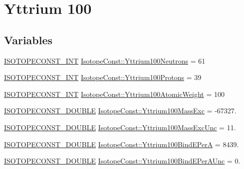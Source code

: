 \hypertarget{group___isotope_const-_yttrium-_y100}{}\section{Yttrium 100}
\label{group___isotope_const-_yttrium-_y100}
\subsection*{Variables}
\begin{DoxyCompactItemize}
\item 
\mbox{\hyperlink{group___isotope_const-_macros_ga5f18360b3e99483a35c32d789e62621c}{I\+S\+O\+T\+O\+P\+E\+C\+O\+N\+S\+T\+\_\+\+I\+NT}} \mbox{\hyperlink{group___isotope_const-_yttrium-_y100_gab26208164dc7413ca570878b73aecf7d}{Isotope\+Const\+::\+Yttrium100\+Neutrons}} = 61
\item 
\mbox{\hyperlink{group___isotope_const-_macros_ga5f18360b3e99483a35c32d789e62621c}{I\+S\+O\+T\+O\+P\+E\+C\+O\+N\+S\+T\+\_\+\+I\+NT}} \mbox{\hyperlink{group___isotope_const-_yttrium-_y100_ga9daeb0b6f7b37ddf890fa050892b2904}{Isotope\+Const\+::\+Yttrium100\+Protons}} = 39
\item 
\mbox{\hyperlink{group___isotope_const-_macros_ga5f18360b3e99483a35c32d789e62621c}{I\+S\+O\+T\+O\+P\+E\+C\+O\+N\+S\+T\+\_\+\+I\+NT}} \mbox{\hyperlink{group___isotope_const-_yttrium-_y100_ga7cd223f77ba880f7defbbbf112046bf8}{Isotope\+Const\+::\+Yttrium100\+Atomic\+Weight}} = 100
\item 
\mbox{\hyperlink{group___isotope_const-_macros_ga8f45a7272ce02c0b4c65c44636ed719a}{I\+S\+O\+T\+O\+P\+E\+C\+O\+N\+S\+T\+\_\+\+D\+O\+U\+B\+LE}} \mbox{\hyperlink{group___isotope_const-_yttrium-_y100_gad18e06f1b2f7f02c685fe1c69b322b91}{Isotope\+Const\+::\+Yttrium100\+Mass\+Exc}} = -\/67327.
\item 
\mbox{\hyperlink{group___isotope_const-_macros_ga8f45a7272ce02c0b4c65c44636ed719a}{I\+S\+O\+T\+O\+P\+E\+C\+O\+N\+S\+T\+\_\+\+D\+O\+U\+B\+LE}} \mbox{\hyperlink{group___isotope_const-_yttrium-_y100_ga5ee14d018c339987daf79589b95e53bc}{Isotope\+Const\+::\+Yttrium100\+Mass\+Exc\+Unc}} = 11.
\item 
\mbox{\hyperlink{group___isotope_const-_macros_ga8f45a7272ce02c0b4c65c44636ed719a}{I\+S\+O\+T\+O\+P\+E\+C\+O\+N\+S\+T\+\_\+\+D\+O\+U\+B\+LE}} \mbox{\hyperlink{group___isotope_const-_yttrium-_y100_ga573424f4a1bd4346028d286c0c639f25}{Isotope\+Const\+::\+Yttrium100\+Bind\+E\+PerA}} = 8439.
\item 
\mbox{\hyperlink{group___isotope_const-_macros_ga8f45a7272ce02c0b4c65c44636ed719a}{I\+S\+O\+T\+O\+P\+E\+C\+O\+N\+S\+T\+\_\+\+D\+O\+U\+B\+LE}} \mbox{\hyperlink{group___isotope_const-_yttrium-_y100_ga5468d526ab3e4c0202b6ff75aa3f5380}{Isotope\+Const\+::\+Yttrium100\+Bind\+E\+Per\+A\+Unc}} = 0.

\end{DoxyCompactItemize}
